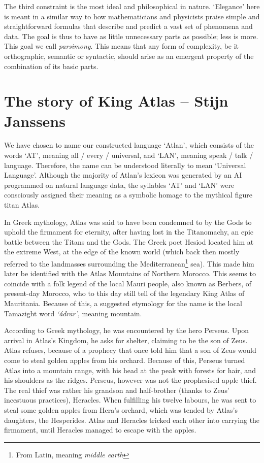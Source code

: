 The third constraint is the most ideal and philosophical in nature. ‘Elegance’ here is meant in a similar way to how mathematicians and physicists praise simple and straightforward formulas that describe and predict a vast set of phenomena and data. The goal is thus to have as little unnecessary parts as possible; less is more. This goal we call {\it parsimony}. This means that any form of complexity, be it orthographic, semantic or syntactic, should arise as an emergent property of the combination of its basic parts. 


\section{The story of King Atlas -- {\small Stijn Janssens}}

We have chosen to name our constructed language ‘Atlan’, which consists of the words ‘AT’, meaning all / every / universal, and ‘LAN’, meaning speak / talk / language. Therefore, the name can be understood literally to mean ‘Universal Language’. Although the majority of Atlan’s lexicon was generated by an AI programmed on natural language data, the syllables ‘AT’ and ‘LAN’ were consciously assigned their meaning as a symbolic homage to the mythical figure titan Atlas.  

In Greek mythology, Atlas was said to have been condemned to by the Gods to uphold the firmament for eternity, after having lost in the Titanomachy, an epic battle between the Titans and the Gods. The Greek poet Hesiod located him at the extreme West, at the edge of the known world (which back then mostly referred to the landmasses surrounding the Mediterranean\footnote{From Latin, meaning \textit{middle earth}} sea). This made him later be identified with the Atlas Mountains of Northern Morocco. This seems to coincide with a folk legend of the local Mauri people, also known as Berbers, of present-day Morocco, who to this day still tell of the legendary King Atlas of Mauritania.  Because of this, a suggested etymology for the name is the local Tamazight word \textit{‘ádrār’}, meaning mountain.  

According to Greek mythology, he was encountered by the hero Perseus. Upon arrival in Atlas’s Kingdom, he asks for shelter, claiming to be the son of Zeus. Atlas refuses, because of a prophecy that once told him that a son of Zeus would come to steal golden apples from his orchard. Because of this, Perseus turned Atlas into a mountain range, with his head at the peak with forests for hair, and his shoulders as the ridges. Perseus, however was not the prophesised apple thief. The real thief was rather his grandson and half-brother (thanks to Zeus’ incestuous practices), Heracles. When fulfilling his twelve labours, he was sent to steal some golden apples from Hera’s orchard, which was tended by Atlas’s daughters, the Hesperides. Atlas and Heracles tricked each other into carrying the firmament, until Heracles managed to escape with the apples.

